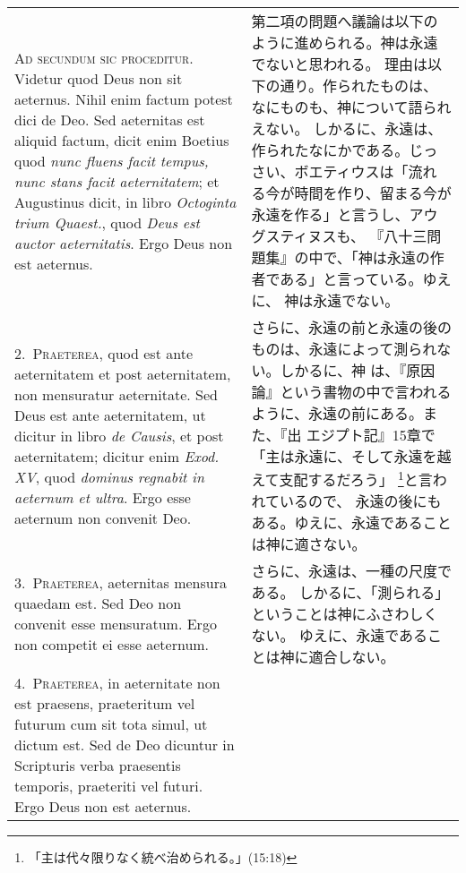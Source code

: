 \documentclass[10pt]{jsarticle} %
\begin{document}
\begin{longtable}{p{21em}p{21em}}

{\huge A}{\scshape d secundum sic proceditur}. Videtur quod Deus non sit aeternus. Nihil
enim factum potest dici de Deo. Sed aeternitas est aliquid factum, dicit
enim Boetius quod {\itshape nunc fluens facit tempus, nunc stans facit
aeternitatem}; et Augustinus dicit, in libro {\it Octoginta trium Quaest.},
quod {\itshape Deus est auctor aeternitatis}. Ergo Deus non est
 aeternus.

&

第二項の問題へ議論は以下のように進められる。神は永遠でないと思われる。
理由は以下の通り。作られたものは、なにものも、神について語られえない。
しかるに、永遠は、作られたなにかである。じっさい、ボエティウスは「流れ
る今が時間を作り、留まる今が永遠を作る」と言うし、アウグスティヌスも、
『八十三問題集』の中で、「神は永遠の作者である」と言っている。ゆえに、
神は永遠でない。

\\

2.~{\scshape Praeterea}, quod est ante aeternitatem et post aeternitatem, non
mensuratur aeternitate. Sed Deus est ante aeternitatem, ut dicitur in
libro {\it de Causis}, et post aeternitatem; dicitur enim {\it Exod. XV}, quod
{\it dominus regnabit in aeternum et ultra}. Ergo esse aeternum non convenit
Deo.
&

さらに、永遠の前と永遠の後のものは、永遠によって測られない。しかるに、神
は、『原因論』という書物の中で言われるように、永遠の前にある。また、『出
エジプト記』15章で「主は永遠に、そして永遠を越えて支配するだろう」
\footnote{「主は代々限りなく統べ治められる。」(15:18)}と言われているので、
永遠の後にもある。ゆえに、永遠であることは神に適さない。

\\

3.~{\scshape Praeterea}, aeternitas mensura quaedam est. Sed Deo non
convenit esse mensuratum. Ergo non competit ei esse aeternum.  

&

さらに、永遠は、一種の尺度である。
しかるに、「測られる」ということは神にふさわしくない。
ゆえに、永遠であることは神に適合しない。

\\

4.~{\scshape Praeterea}, in aeternitate non est praesens, praeteritum
vel futurum cum sit tota simul, ut dictum est. Sed de Deo dicuntur in
Scripturis verba praesentis temporis, praeteriti vel futuri. Ergo Deus
non est aeternus.


\end{longtable}
\end{document}
